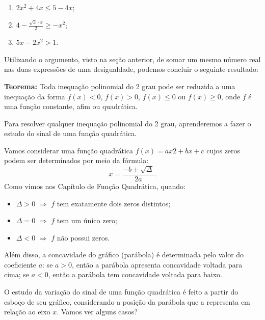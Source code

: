 \begin{enumerate}
\item{}
$2x^2 + 4x \leq 5 - 4x$;

\item{}
$4 - \frac{\sqrt{3} \cdot x}{2} \geq -x^2$;

\item{}
$5x - 2x^2 > 1$.
\end{enumerate}

Utilizando o argumento, visto na seção anterior, de somar um mesmo número real nas duas expressões de uma desigualdade, podemos concluir o seguinte resultado:
 
\begin{observation}
\textbf{Teorema:} Toda inequação polinomial do 2 grau pode ser reduzida a uma inequação da forma $f(x) <0$, $f(x) > 0$, $f(x) \leq 0$ ou $f(x) \geq 0$, onde $f$ é uma função constante, afim ou quadrática.

\end{observation}

Para resolver qualquer inequação polinomial do 2 grau, aprenderemos a fazer o estudo do sinal de uma função quadrática.

Vamos considerar uma função quadrática $f(x) = ax2 + bx + c$ cujos zeros podem ser determinados por meio da fórmula:
$$
x = \frac{-b \pm \sqrt{\Delta}}{2a}.
$$  
Como vimos nos Capítulo de Função Quadrática, quando:

\begin{itemize}
\item  $\Delta >0$ $\Rightarrow$ $f$ tem exatamente dois zeros distintos;

\item   $\Delta =0$ $\Rightarrow$ $f$ tem um único zero;

\item  $\Delta <0$ $\Rightarrow$ $f$ não possui zeros.
\end{itemize}

Além disso, a concavidade do gráfico (parábola) é determinada pelo valor do coeficiente $a$: se  $a>0$, então a parábola apresenta concavidade voltada para cima; se $a<0$, então a parábola tem concavidade voltada para baixo. 


O estudo da variação do sinal de uma função quadrática é feito a partir do esboço de seu gráfico, considerando a posição da parábola que a representa em relação ao eixo $x$. Vamos ver alguns casos?


